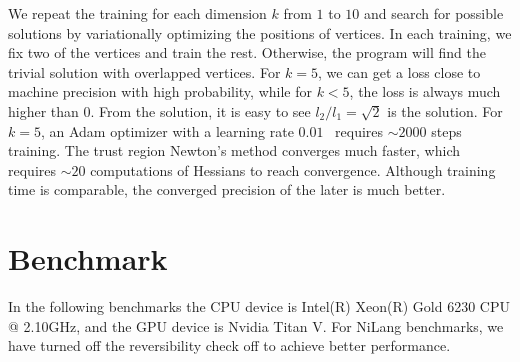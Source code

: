 \documentclass{article}
\newcommand{\<}{\langle}
\renewcommand{\>}{\rangle}
\theoremstyle{definition}\newtheorem{definition}{\textit{Definition}}
\begin{document}
We repeat the training for each dimension $k$ from $1$ to $10$ and search for possible solutions by variationally optimizing the positions of vertices.
In each training, we fix two of the vertices and train the rest. Otherwise, the program will find the trivial solution with overlapped vertices. 
For $k=5$, we can get a loss close to machine precision with high probability, while for $k < 5$, the loss is always much higher than $0$.
From the solution, it is easy to see $l_2/l_1 = \sqrt{2}$ is the solution.
For $k=5$, an Adam optimizer with a learning rate $0.01$~\cite{Kingma2014} requires $\sim2000$ steps training.
The trust region Newton's method converges much faster, which requires $\sim 20$ computations of Hessians to reach convergence.
Although training time is comparable, the converged precision of the later is much better.

\section{Benchmark}\label{sec:benchmark}

In the following benchmarks the CPU device is Intel(R) Xeon(R) Gold 6230 CPU @ 2.10GHz, and the GPU device is Nvidia Titan V.
For NiLang benchmarks, we have turned off the reversibility check off to achieve better performance.
\end{document}
